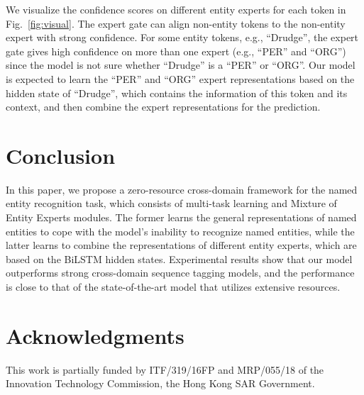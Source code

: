 \documentclass[11pt,a4paper]{article}
\begin{document}
We visualize the confidence scores on different entity experts for each token in Fig.~\ref{fig:visual}. 
The expert gate can align non-entity tokens to the non-entity expert with strong confidence. For some entity tokens, e.g., ``Drudge'', the expert gate gives high confidence on more than one expert (e.g., ``PER'' and ``ORG'') since the model is not sure whether ``Drudge'' is a ``PER'' or ``ORG''. Our model is expected to learn the ``PER'' and ``ORG'' expert representations based on the hidden state of ``Drudge'', which contains the information of this token and its context, and then combine the expert representations for the prediction.


\section{Conclusion}
In this paper, we propose a zero-resource cross-domain framework for the named entity recognition task, which consists of multi-task learning and Mixture of Entity Experts modules.
The former learns the general representations of named entities to cope with the model's inability to recognize named entities, while the latter learns to combine the representations of different entity experts, which are based on the BiLSTM hidden states.
Experimental results show that our model outperforms strong cross-domain sequence tagging models, and the performance is close to that of the state-of-the-art model that utilizes extensive resources.


\section*{Acknowledgments}
This work is partially funded by ITF/319/16FP and MRP/055/18 of the Innovation Technology Commission, the Hong Kong SAR Government.



\end{document}
